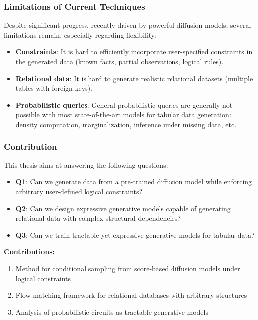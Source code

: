 

\begin{frame}
\frametitle{Limitations of Current Techniques}

Despite significant progress, recently driven by powerful diffusion models, several limitations remain, especially regarding flexibility:

\begin{itemize}
    \item \textbf{Constraints}: It is hard to efficiently incorporate user-specified constraints in the generated data (known facts, partial observations, logical rules). %
    \item \textbf{Relational data}: It is hard to generate realistic relational datasets (multiple tables with foreign keys). %
    \item \textbf{Probabilistic queries}: General probabilistic queries are generally not possible with most state-of-the-art models for tabular data generation: density computation, marginalization, inference under missing data, etc.
\end{itemize}

\end{frame}

\begin{frame}

\frametitle{Contribution}

This thesis aims at answering the following questions:

\begin{itemize}
    \item \textbf{Q1}: Can we generate data from a pre-trained diffusion model while enforcing arbitrary user-defined logical constraints?
    \item \textbf{Q2}: Can we design expressive generative models capable of generating relational data with complex structural dependencies?
    \item \textbf{Q3}: Can we train tractable yet expressive generative models for tabular data?
\end{itemize}

\bigskip

\textbf{Contributions:}
\begin{enumerate}
    \item Method for conditional sampling from score-based diffusion models under logical constraints
    \item Flow-matching framework for relational databases with arbitrary structures
    \item Analysis of probabilistic circuits as tractable generative models
\end{enumerate}

\end{frame}
